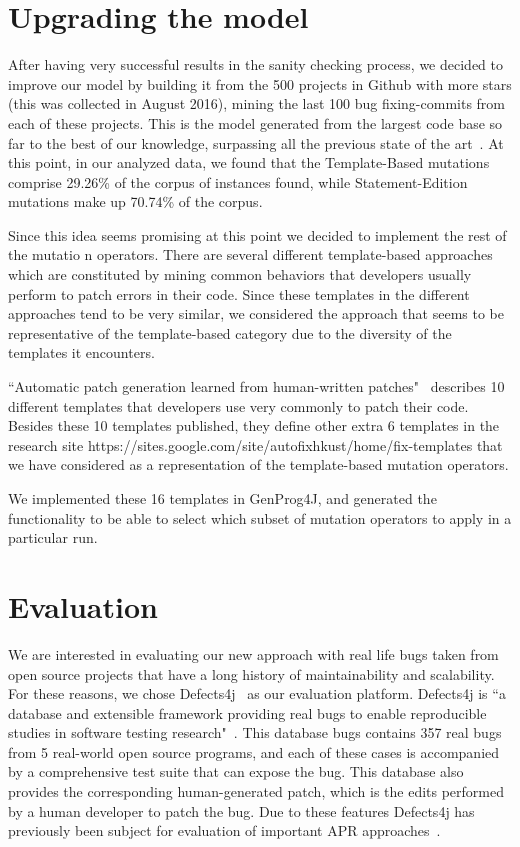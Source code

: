 \documentclass[conference]{IEEEtran}
\begin{document}
\section{Upgrading the model}
After having very successful results in the sanity checking process, we decided 
to improve our model by building it from the 500 projects in Github with more 
stars (this was collected in August 2016), mining the last 100 bug fixing-commits from each of these projects. This is the model generated from the largest code base so far to the best 
of our knowledge, surpassing all the previous state of the 
art~\cite{long15,Soto15,zhong15,matias15,xuan16}. At this point, in our analyzed data, 
we found that the Template-Based mutations comprise 29.26\% of the corpus of 
instances found, while Statement-Edition mutations make up 70.74\% of the 
corpus.

Since this idea seems promising at this point we decided to implement the rest 
of the mutatio
n operators. There are several different template-based approaches 
\cite{kim2013,fan15,long15} which are constituted by mining common behaviors 
that developers usually perform to patch errors in their code. Since these 
templates in the different approaches tend to be very similar, we considered the 
approach that seems to be representative of the template-based category due to 
the diversity of the templates it encounters. 

``Automatic patch generation learned from human-written patches"~\cite{kim2013} describes 10 different templates that 
developers use very commonly to patch their code. Besides these 10 templates 
published, they define other extra 6 templates in the research site 
https://sites.google.com/site/autofixhkust/home/fix-templates that we have 
considered as a representation of the template-based mutation operators.

We implemented these 16 templates in GenProg4J, and generated the functionality 
to be able to select which subset of mutation operators to apply in a particular 
run.

\section{Evaluation}
We are interested in evaluating our new approach with real life bugs taken from 
open source projects that have a long history of maintainability and 
scalability. For these reasons, we chose Defects4j~\cite{just14} as our 
evaluation platform. Defects4j is ``a database and extensible 
framework providing real bugs to enable reproducible studies in software testing 
research"~\cite{just14}. This database bugs contains 357 real bugs from 5 
real-world open source programs, and each of these cases is accompanied by a 
comprehensive test suite that can expose the bug. This database also provides 
the corresponding human-generated patch, which is the edits performed by a human 
developer to patch the bug. Due to these features Defects4j has previously been 
subject for evaluation of important APR approaches~\cite{Durieux15}.
\end{document}
